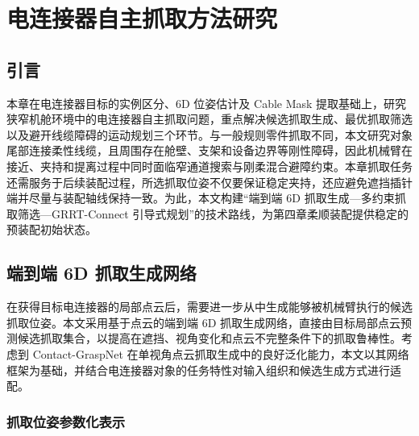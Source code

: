 \chapter{电连接器自主抓取方法研究}

\section{引言}

本章在电连接器目标的实例区分、6D 位姿估计及 Cable Mask 提取基础上，研究狭窄机舱环境中的电连接器自主抓取问题，重点解决候选抓取生成、最优抓取筛选以及避开线缆障碍的运动规划三个环节。与一般规则零件抓取不同，本文研究对象尾部连接柔性线缆，且周围存在舱壁、支架和设备边界等刚性障碍，因此机械臂在接近、夹持和提离过程中同时面临窄通道搜索与刚柔混合避障约束。本章抓取任务还需服务于后续装配过程，所选抓取位姿不仅要保证稳定夹持，还应避免遮挡插针端并尽量与装配轴线保持一致。为此，本文构建“端到端 6D 抓取生成—多约束抓取筛选—GRRT-Connect 引导式规划”的技术路线，为第四章柔顺装配提供稳定的预装配初始状态。

\section{端到端 6D 抓取生成网络}

在获得目标电连接器的局部点云后，需要进一步从中生成能够被机械臂执行的候选抓取位姿。本文采用基于点云的端到端 6D 抓取生成网络，直接由目标局部点云预测候选抓取集合，以提高在遮挡、视角变化和点云不完整条件下的抓取鲁棒性。考虑到 Contact-GraspNet 在单视角点云抓取生成中的良好泛化能力，本文以其网络框架为基础，并结合电连接器对象的任务特性对输入组织和候选生成方式进行适配。

\subsection{抓取位姿参数化表示}

